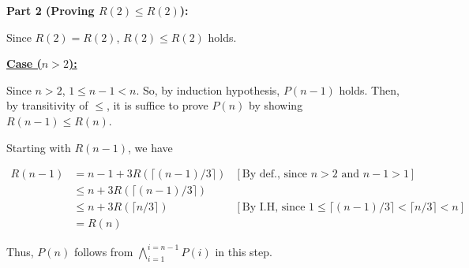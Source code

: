 \documentclass[12pt]{article}
\begin{document}
\begin{enumerate}[a.]
    \bigskip

    \textbf{Part 2 (Proving $R(2) \leq R(2)$):}

    \bigskip

    Since $R(2) = R(2)$, $R(2) \leq R(2)$ holds.

    \bigskip

    \underline{\textbf{Case ($n > 2$):}}

    \bigskip

    Since $n > 2$, $1 \leq n-1 < n$. So, by induction hypothesis, $P(n-1)$
    holds. Then, by transitivity of $\leq$, it is suffice to prove $P(n)$
    by showing $R(n-1) \leq R(n)$.

    \bigskip

    Starting with $R(n-1)$, we have

    \begin{align}
    R(n-1) &= n-1 + 3R(\lceil (n-1)/3 \rceil) & [\text{By def., since $n > 2$ and $n - 1 > 1$}]\\
    &\leq n + 3R(\lceil (n-1)/3 \rceil)\\
    &\leq n + 3R(\lceil n/3 \rceil) & [\text{By I.H, since $1 \leq \lceil (n-1)/3 \rceil < \lceil n/3 \rceil < n$}]\\
    &= R(n)
    \end{align}

    \bigskip

    Thus, $P(n)$ follows from $\bigwedge\limits_{i=1}^{i=n-1} P(i)$ in this step.













\end{enumerate}
\end{document}
